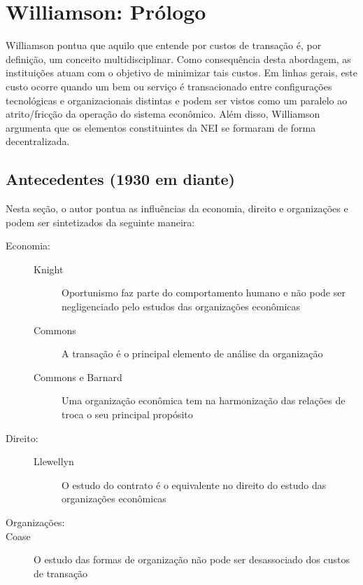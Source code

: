 \section*{Williamson: Prólogo}

Williamson pontua que aquilo que entende por custos de transação é, por definição, um conceito multidisciplinar. Como consequência desta abordagem, as instituições atuam com o objetivo de minimizar tais custos. Em linhas gerais, este custo ocorre quando um bem ou serviço é transacionado entre configurações tecnológicas e organizacionais distintas e podem ser vistos como um paralelo ao atrito/fricção da operação do sistema econômico. Além disso, Williamson argumenta que os elementos constituintes da NEI se formaram de forma decentralizada.

\subsection*{Antecedentes (1930 em diante)}

Nesta seção, o autor pontua as influências da economia, direito e organizações e podem ser sintetizados da seguinte maneira:

\begin{description}
	\item[Economia:] {\color{white}{bla}}
	\begin{description}
		\item[Knight] Oportunismo faz parte do comportamento humano e não pode ser negligenciado pelo estudos das organizações econômicas
		\item[Commons] A transação é o principal elemento de análise da organização
		\item[Commons e Barnard] Uma organização econômica tem na harmonização das relações de troca o seu principal propósito
	\end{description}
	\item[Direito:] {\color{white}{bla}}
	\begin{description}
		\item[Llewellyn] O estudo do contrato é o equivalente no direito do estudo das organizações econômicas
	\end{description}
	\item[Organizações:] {\color{white}{bla}}
	\item[Coase] O estudo das formas de organização não pode ser desassociado dos custos de transação
\end{description}

